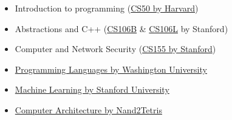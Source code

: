 \documentclass[10pt,a4paper]{../altacv}
\begin{document}

\begin{itemize}
	\item Introduction to programming (\href{https://cs50.harvard.edu/}{CS50 by Harvard})
	\item Abstractions and C++ (\href{https://web.stanford.edu/class/cs106b/}{CS106B} \& \href{http://web.stanford.edu/class/cs106l/index.html}{CS106L} by Stanford)
	\item Computer and Network Security (\href{https://crypto.stanford.edu/cs155/}{CS155 by Stanford})
\end{itemize}

\medskip

\begin{itemize}
	\item \href{https://www.coursera.org/instructor/~873260}{Programming Languages by Washington University}
	\item \href{https://www.coursera.org/learn/machine-learning}{Machine Learning by Stanford University}
	\item \href{http://nand2tetris.org/}{Computer Architecture by Nand2Tetris}
\end{itemize}

\medskip










\end{document}
